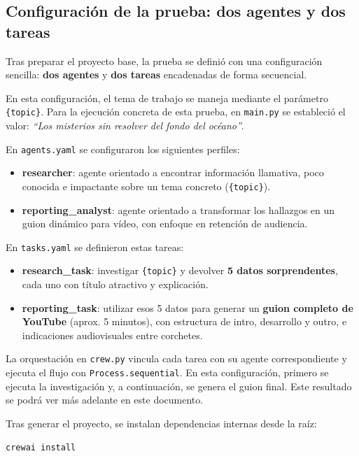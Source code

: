 \documentclass[12pt,a4paper]{article}
\begin{document}
\subsection{Configuración de la prueba: dos agentes y dos tareas}

Tras preparar el proyecto base, la prueba se definió con una configuración sencilla: \textbf{dos agentes} y \textbf{dos tareas} encadenadas de forma secuencial.

En esta configuración, el tema de trabajo se maneja mediante el parámetro \verb|{topic}|. Para la ejecución concreta de esta prueba, en \texttt{main.py} se estableció el valor: \textit{``Los misterios sin resolver del fondo del océano''}.

En \texttt{agents.yaml} se configuraron los siguientes perfiles:

\begin{itemize}
    \item \textbf{researcher}: agente orientado a encontrar información llamativa, poco conocida e impactante sobre un tema concreto (\verb|{topic}|).
    \item \textbf{reporting\_analyst}: agente orientado a transformar los hallazgos en un guion dinámico para vídeo, con enfoque en retención de audiencia.
\end{itemize}

En \texttt{tasks.yaml} se definieron estas tareas:

\begin{itemize}
    \item \textbf{research\_task}: investigar \verb|{topic}| y devolver \textbf{5 datos sorprendentes}, cada uno con título atractivo y explicación.
    \item \textbf{reporting\_task}: utilizar esos 5 datos para generar un \textbf{guion completo de YouTube} (aprox. 5 minutos), con estructura de intro, desarrollo y outro, e indicaciones audiovisuales entre corchetes.
\end{itemize}

La orquestación en \texttt{crew.py} vincula cada tarea con su agente correspondiente y ejecuta el flujo con \texttt{Process.sequential}. En esta configuración, primero se ejecuta la investigación y, a continuación, se genera el guion final. Este resultado se podrá ver más adelante en este documento.

Tras generar el proyecto, se instalan dependencias internas desde la raíz:

\begin{verbatim}
crewai install
\end{verbatim}
\end{document}
